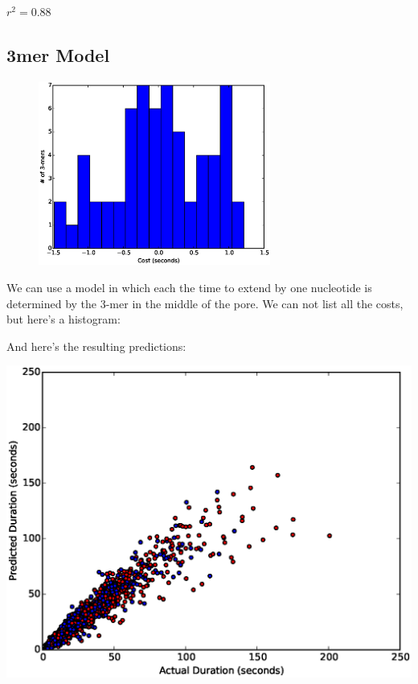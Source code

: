 \documentclass[11pt]{article}
\begin{document}
$r^2=0.88$


        \newpage
        \subsection*{3mer Model}
        \begin{figure}
        \vspace{-50pt}
        \includegraphics[width=3in]{part11hist3}
        \vspace{-70pt}
        \end{figure}
        We can use a model in which each the time to extend by one nucleotide is determined by the 3-mer in the middle of the
        pore.  We can not list all the costs, but here's a histogram:

        \vspace{1.5in}

        And here's the resulting predictions:
        
\includegraphics[width=\textwidth]{part11scatter3mer}
\end{document}
